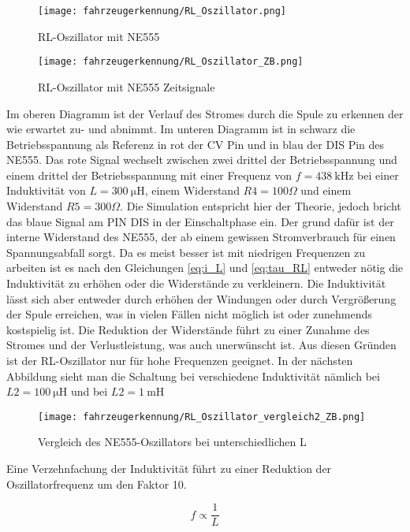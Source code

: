 \begin{figure}[H]
    \centering
    \texttt{[image: fahrzeugerkennung/RL\_Oszillator.png]}
    \caption{RL-Oszillator mit NE555}
\end{figure}

\begin{figure}[H]
    \centering
    \texttt{[image: fahrzeugerkennung/RL\_Oszillator\_ZB.png]}
    \caption{RL-Oszillator mit NE555 Zeitsignale}
\end{figure}

Im oberen Diagramm ist der Verlauf des Stromes durch die Spule zu erkennen der wie erwartet zu- und abnimmt. Im unteren Diagramm ist in 
schwarz die Betriebsspannung als Referenz in rot der CV Pin und in blau der DIS Pin des NE555. Das rote Signal wechselt zwischen zwei drittel der Betriebsspannung 
und einem drittel der Betriebsspannung mit einer Frequenz von $f = \SI{438}{\kilo\hertz}$ bei einer Induktivität von $L = \SI{300}{\micro\henry}$, einem Widerstand $R4 = 100\Omega$ und einem
Widerstand $R5 = 300\Omega$. Die Simulation entspricht hier der Theorie, jedoch bricht das blaue Signal am PIN DIS in der Einschaltphase ein.
Der grund dafür ist der interne Widerstand des NE555, der ab einem gewissen Stromverbrauch für einen Spannungsabfall sorgt. Da es meist besser ist mit
niedrigen Frequenzen zu arbeiten ist es nach den Gleichungen \ref{eq:i_L} und \ref{eq:tau_RL} entweder nötig die Induktivität zu erhöhen oder die Widerstände zu verkleinern.
Die Induktivität lässt sich aber entweder durch erhöhen der Windungen oder durch Vergrößerung der Spule erreichen, was in vielen Fällen nicht möglich ist oder zunehmends kostspielig ist.
Die Reduktion der Widerstände führt zu einer Zunahme des Stromes und der Verlustleistung, was auch unerwünscht ist.
Aus diesen Gründen ist der RL-Oszillator nur für hohe Frequenzen geeignet. In der nächsten Abbildung sieht man die Schaltung bei verschiedene Induktivität
nämlich bei $L2 = \SI{100}{\micro\henry}$ und bei $L2 = \SI{1}{\milli\henry}$

\begin{figure}[H]
    \centering
    \texttt{[image: fahrzeugerkennung/RL\_Oszillator\_vergleich2\_ZB.png]}
    \caption{Vergleich des NE555-Oszillators bei unterschiedlichen L}
\end{figure}

Eine Verzehnfachung der Induktivität führt zu einer Reduktion der Oszillatorfrequenz um den Faktor 10.

\begin{equation} \label{iq:f_NE555}
    f \propto \frac{1}{L}
\end{equation} 

